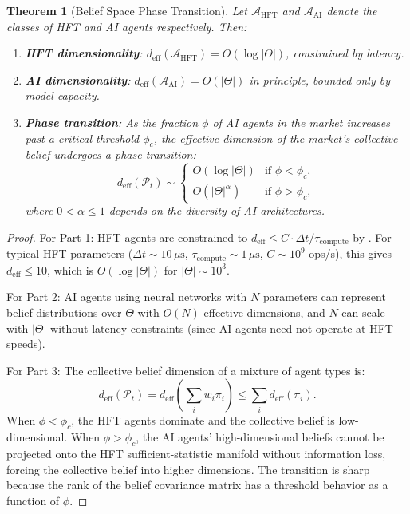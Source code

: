 \documentclass[12pt,a4paper]{article}
\newtheorem{theorem}{Theorem}[section]
\theoremstyle{definition}
\newcommand{\PP}{\mathcal{P}}
\begin{document}
\begin{theorem}[Belief Space Phase Transition]\label{thm:phase-transition}
Let $\mathcal{A}_{\mathrm{HFT}}$ and $\mathcal{A}_{\mathrm{AI}}$ denote the classes of HFT and AI agents respectively. Then:
\begin{enumerate}
  \item \textbf{HFT dimensionality}: $d_{\mathrm{eff}}(\mathcal{A}_{\mathrm{HFT}}) = O(\log |\Theta|)$, constrained by latency.

  \item \textbf{AI dimensionality}: $d_{\mathrm{eff}}(\mathcal{A}_{\mathrm{AI}}) = O(|\Theta|)$ in principle, bounded only by model capacity.

  \item \textbf{Phase transition}: As the fraction $\phi$ of AI agents in the market increases past a critical threshold $\phi_c$, the effective dimension of the market's collective belief undergoes a phase transition:
  \begin{equation}\label{eq:phase-transition}
    d_{\mathrm{eff}}(\PP_t) \sim \begin{cases}
      O(\log |\Theta|) & \text{if } \phi < \phi_c, \\
      O(|\Theta|^\alpha) & \text{if } \phi > \phi_c,
    \end{cases}
  \end{equation}
  where $0 < \alpha \leq 1$ depends on the diversity of AI architectures.
\end{enumerate}
\end{theorem}

\begin{proof}
For Part 1: HFT agents are constrained to $d_{\mathrm{eff}} \leq C \cdot \Delta t / \tau_{\mathrm{compute}}$ by . For typical HFT parameters ($\Delta t \sim 10\,\mu\mathrm{s}$, $\tau_{\mathrm{compute}} \sim 1\,\mu\mathrm{s}$, $C \sim 10^9$ ops/s), this gives $d_{\mathrm{eff}} \leq 10$, which is $O(\log |\Theta|)$ for $|\Theta| \sim 10^3$.

For Part 2: AI agents using neural networks with $N$ parameters can represent belief distributions over $\Theta$ with $O(N)$ effective dimensions, and $N$ can scale with $|\Theta|$ without latency constraints (since AI agents need not operate at HFT speeds).

For Part 3: The collective belief dimension of a mixture of agent types is:
\begin{equation}
  d_{\mathrm{eff}}(\PP_t) = d_{\mathrm{eff}}\left(\sum_i w_i \pi_i\right) \leq \sum_i d_{\mathrm{eff}}(\pi_i).
\end{equation}
When $\phi < \phi_c$, the HFT agents dominate and the collective belief is low-dimensional. When $\phi > \phi_c$, the AI agents' high-dimensional beliefs cannot be projected onto the HFT sufficient-statistic manifold without information loss, forcing the collective belief into higher dimensions. The transition is sharp because the rank of the belief covariance matrix has a threshold behavior as a function of $\phi$.
\end{proof}
\end{document}
